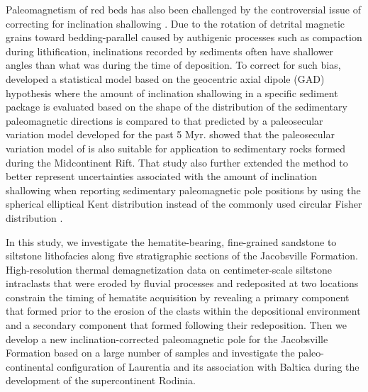 \documentclass[draft]{agujournal2019}
\begin{document}
Paleomagnetism of red beds has also been challenged by the controversial issue of correcting for inclination shallowing \cite{King1955a, Taux2004b, Bilardello2016b}. Due to the rotation of detrital magnetic grains toward bedding-parallel caused by authigenic processes such as compaction during lithification, inclinations recorded by sediments often have shallower angles than what was during the time of deposition. To correct for such bias,  developed a statistical model based on the geocentric axial dipole (GAD) hypothesis where the amount of inclination shallowing in a specific sediment package is evaluated based on the shape of the distribution of the sedimentary paleomagnetic directions is compared to that predicted by a paleosecular variation model developed for the past 5 Myr.  showed that the paleosecular variation model of  is also suitable for application to sedimentary rocks formed during the Midcontinent Rift. That study also further extended the method to better represent uncertainties associated with the amount of inclination shallowing when reporting sedimentary paleomagnetic pole positions by using the spherical elliptical Kent distribution \cite{Kent1982a} instead of the commonly used circular Fisher distribution \cite{Fisher1953a}. 

In this study, we investigate the hematite-bearing, fine-grained sandstone to siltstone lithofacies along five stratigraphic sections of the Jacobsville Formation. High-resolution thermal demagnetization data on centimeter-scale siltstone intraclasts that were eroded by fluvial processes and redeposited at two locations constrain the timing of hematite acquisition by revealing a primary component that formed prior to the erosion of the clasts within the depositional environment and a secondary component that formed following their redeposition. Then we develop a new inclination-corrected paleomagnetic pole for the Jacobsville Formation based on a large number of samples and investigate the paleo-continental configuration of Laurentia and its association with Baltica during the development of the supercontinent Rodinia. 
\end{document}
